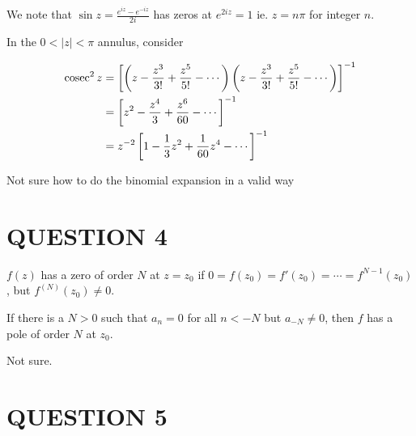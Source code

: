 \documentclass[a4paper]{article}
\begin{document}
We note that $ \sin z = \frac{e^{iz} - e^{-iz}}{2i} $ has zeros at $ e^{2iz} = 1 $ ie. $ z = n \pi $ for integer $ n $. 

In the $ 0 < | z | < \pi $ annulus, consider

\begin{align*}
\operatorname{cosec}^{2} z& = \left[     \left( z - \frac{z^{3}}{3!} + \frac{z^{5}}{5!} - \cdots \right)\left( z - \frac{z^{3}}{3!} + \frac{z^{5}}{5!} - \cdots \right)  \right]^{-1}  \\
& = \left[   z^{2} - \frac{z^{4}}{3} + \frac{z^{6}}{60} - \cdots \right]^{-1} \\
& = z^{-2} \left[   1 - \frac{1}{3} z^{2} + \frac{1}{60} z^{4} - \cdots \right]^{-1}
\end{align*}

Not sure how to do the binomial expansion in a valid way





\section{QUESTION 4}


$ f(z) $ has a zero of order $ N $ at $ z = z_{0} $ if $ 0 = f(z_{0}) = f'(z_{0}) = \cdots = f^{N-1}(z_{0}) $, but $ f^{(N)}(z_{0}) \neq 0 $. 

If there is a $ N > 0 $ such that $ a_n = 0 $ for all $ n < -N $ but $ a_{-N} \neq 0$,  then $ f $ has a pole of order $ N $ at $ z_{0} $.

Not sure.



\section{QUESTION 5}
\end{document}
